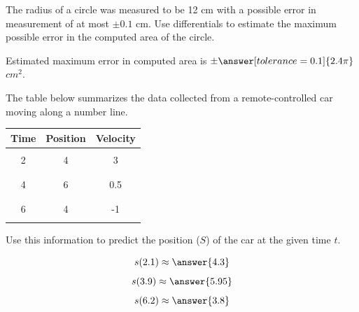 \documentclass{ximera}
\begin{document}
  \begin{problem}\label{prob:240hom6prob4}
  The radius of a circle was measured to be 12 cm with a possible error in measurement of at most $\pm 0.1$ cm.  Use differentials to estimate the maximum possible error in the computed area of the circle.

Estimated maximum error in computed area is $\pm\answer[tolerance=0.1]{2.4\pi}$ $cm^2$.
  \end{problem}
  
   \begin{problem}\label{prob:240hom6prob5}
The table below summarizes the data collected from a remote-controlled car moving along a number line.  

\begin{center}
\begin{tabular}{|c|c|c|}
Time & Position & Velocity  \\
 \hline
 \hline
   & &\\
 2 & 4  & 3 \\
  & &\\
  \hline
   & &\\
 4 & 6 & 0.5\\
  & &\\
 \hline
  & &\\
 6 & 4 &-1 \\
  & &\\
 \hline
 \end{tabular}
\end{center}

Use this information to predict the position ($S$) of the car at the given time $t$.

$$s(2.1)\approx\answer{4.3}$$
$$s(3.9)\approx\answer{5.95}$$
$$s(6.2)\approx\answer{3.8}$$

\end{problem}

 
\end{document}
